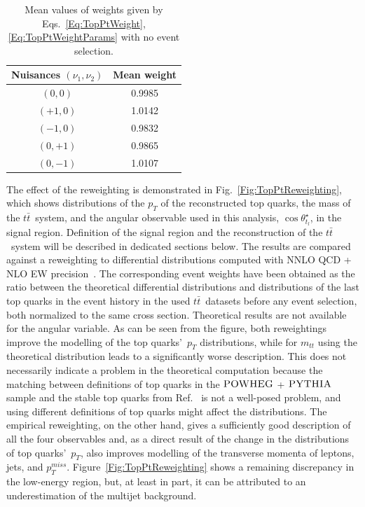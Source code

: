 \begin{table}
  \centering
  \caption{Mean values of weights given by Eqs.~\ref{Eq:TopPtWeight}, \ref{Eq:TopPtWeightParams} with no event selection.}
  \label{Tab:TopPtMeanWeights}
  \begin{tabular}{cc}
  \hline
  \hline
  Nuisances $(\nu_1, \nu_2)$  & Mean weight \\
  \hline
  $(0, 0)$   & 0.9985 \\
  $(+1, 0)$  & 1.0142 \\
  $(-1, 0)$  & 0.9832 \\
  $(0, +1)$  & 0.9865 \\
  $(0, -1)$  & 1.0107 \\
  \hline
  \hline
  \end{tabular}
\end{table}
The effect of the reweighting is demonstrated in Fig.~\ref{Fig:TopPtReweighting}, which shows distributions of the $p_{T}$ of the reconstructed top quarks, the mass of the $t\bar t$~system, and the angular observable used in this analysis, $\cos\theta^{\star}_{t_{l}}$, in the signal region.
Definition of the signal region and the reconstruction of the $t\bar t$~system will be described in dedicated sections below.
The results are compared against a reweighting to differential distributions computed with NNLO QCD + NLO EW precision~\cite{Czakon:2017wor}.
The corresponding event weights have been obtained as the ratio between the theoretical differential distributions and distributions of the last top quarks in the event history in the used $t\bar t$~datasets before any event selection, both normalized to the same cross section.
Theoretical results are not available for the angular variable.
As can be seen from the figure, both reweightings improve the modelling of the top quarks'~$p_{T}$ distributions, while for $m_{tt}$ using the theoretical distribution leads to a significantly worse description.
This does not necessarily indicate a problem in the theoretical computation because the matching between definitions of top quarks in the $\textsc{POWHEG}$ + $\textsc{PYTHIA}$ sample and the stable top quarks from Ref.~\cite{Czakon:2017wor} is not a well-posed problem, and using different definitions of top quarks might affect the distributions.
The empirical reweighting, on the other hand, gives a sufficiently good description of all the four observables and, as a direct result of the change in the distributions of top quarks'~$p_{T}$, also improves modelling of the transverse momenta of leptons, jets, and $p_{T}^{miss}$.
Figure~\ref{Fig:TopPtReweighting} shows a remaining discrepancy in the low-energy region, but, at least in part, it can be attributed to an underestimation of the multijet background.

